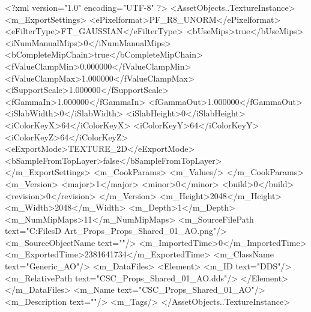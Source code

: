 <?xml version="1.0" encoding="UTF-8" ?>
<AssetObjects..TextureInstance>
	<m_ExportSettings>
		<ePixelformat>PF_R8_UNORM</ePixelformat>
		<eFilterType>FT_GAUSSIAN</eFilterType>
		<bUseMips>true</bUseMips>
		<iNumManualMips>0</iNumManualMips>
		<bCompleteMipChain>true</bCompleteMipChain>
		<fValueClampMin>0.000000</fValueClampMin>
		<fValueClampMax>1.000000</fValueClampMax>
		<fSupportScale>1.000000</fSupportScale>
		<fGammaIn>1.000000</fGammaIn>
		<fGammaOut>1.000000</fGammaOut>
		<iSlabWidth>0</iSlabWidth>
		<iSlabHeight>0</iSlabHeight>
		<iColorKeyX>64</iColorKeyX>
		<iColorKeyY>64</iColorKeyY>
		<iColorKeyZ>64</iColorKeyZ>
		<eExportMode>TEXTURE_2D</eExportMode>
		<bSampleFromTopLayer>false</bSampleFromTopLayer>
	</m_ExportSettings>
	<m_CookParams>
		<m_Values/>
	</m_CookParams>
	<m_Version>
		<major>1</major>
		<minor>0</minor>
		<build>0</build>
		<revision>0</revision>
	</m_Version>
	<m_Height>2048</m_Height>
	<m_Width>2048</m_Width>
	<m_Depth>1</m_Depth>
	<m_NumMipMaps>11</m_NumMipMaps>
	<m_SourceFilePath text="C:\Users\Shadow\Desktop\Working Files\3D Art\Textures\CSC_Props\Current\textures\CSC_Props_Shared_01_AO.png"/>
	<m_SourceObjectName text=""/>
	<m_ImportedTime>0</m_ImportedTime>
	<m_ExportedTime>2381641734</m_ExportedTime>
	<m_ClassName text="Generic_AO"/>
	<m_DataFiles>
		<Element>
			<m_ID text="DDS"/>
			<m_RelativePath text="CSC_Props_Shared_01_AO.dds"/>
		</Element>
	</m_DataFiles>
	<m_Name text="CSC_Props_Shared_01_AO"/>
	<m_Description text=""/>
	<m_Tags/>
</AssetObjects..TextureInstance>
